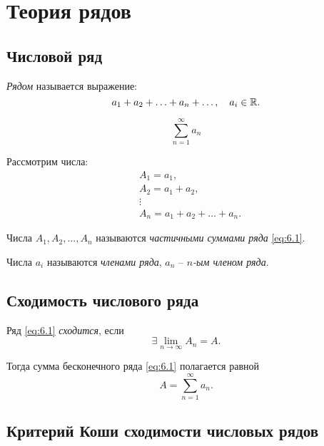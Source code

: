 \section{Теория рядов}

\setcounter{subsection}{28}

\subsection{Числовой ряд}

\begin{definition}
    \emph{Рядом} называется выражение:
    \[
        a_1 + a_2 + \ldots + a_n + \ldots, \quad a_i \in \mathbb{R}.
    \]

    \begin{equation}\label{eq:6.1}
        \sum_{n=1}^{\infty}a_n
    \end{equation}

    Рассмотрим числа:
    \begin{align*}
         & A_1 = a_1,                      \\
         & A_2 = a_1 + a_2,                \\
         & \vdots                          \\
         & A_n = a_1 + a_2 + \ldots + a_n.
    \end{align*}

    Числа $ A_1,A_2,\ldots,A_n $ называются \emph{частичными суммами ряда} \ref{eq:6.1}.
\end{definition}

\begin{remark}
    Числа $ a_i $ называются \emph{членами ряда}, $ a_n $ -- \emph{$ n $-ым членом ряда}.
\end{remark}

\newpage

\subsection{Сходимость числового ряда}

\begin{definition}
    Ряд \ref{eq:6.1} \emph{сходится}, если
    \[
        \exists \underset{n\rightarrow\infty}{\lim}A_n = A.
    \]

    Тогда сумма бесконечного ряда \ref{eq:6.1} полагается равной
    \[
        A = \sum_{n=1}^{\infty}a_n.
    \]
\end{definition}

\subsection{Критерий Коши сходимости числовых рядов}


